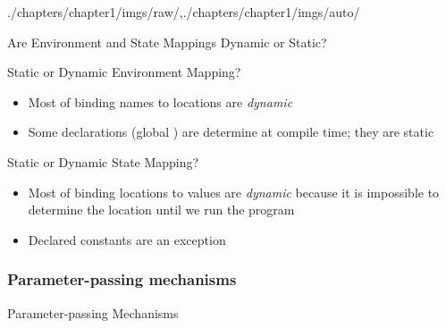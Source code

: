 \begin{graphicspathcontext}{{./chapters/chapter1/imgs/raw/},{./chapters/chapter1/imgs/auto/}}
\begin{bibunit}[apalike]
\begin{frame}{{}{Are Environment and State Mappings Dynamic or Static?}}
	\vspace{.5cm}
	\begin{block}{Static or Dynamic Environment Mapping?}
	\begin{itemize}
	\item Most of binding names to locations are \emph{dynamic}
	\item Some declarations (\eg global ) are determine at compile time; they are static
	\end{itemize}
	\end{block}
	\vspace{.5cm}
	\begin{block}{Static or Dynamic State Mapping?}
	\begin{itemize}
	\item Most of binding locations to values are \emph{dynamic} because it is impossible to determine the location until we run the program
	\item Declared constants are an exception
	\end{itemize}
	\end{block}
\end{frame}

\subsubsection{Parameter-passing mechanisms}

\begin{frame}{{Parameter-passing} Mechanisms}
	\vspace{1cm}
	\vspace{1cm}
	\begin{columns}
		\begin{column}{.33\linewidth}
		\end{column}
		\begin{column}{.33\linewidth}
		\end{column}
		\begin{column}{.33\linewidth}
		\end{column}
	\end{columns}
\end{frame}


\end{bibunit}
\end{graphicspathcontext}

